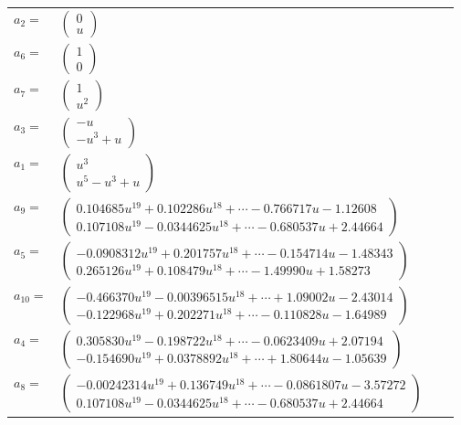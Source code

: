 \documentclass[1p]{elsarticle_modified}
\theoremstyle{definition}
\begin{document}
\begin{tabular}{m{7pt} m{180pt} m{7pt} m{180pt} }
\flushright $a_{2}=$&$\begin{pmatrix}0\\u\end{pmatrix}$ \\
\flushright $a_{6}=$&$\begin{pmatrix}1\\0\end{pmatrix}$ \\
\flushright $a_{7}=$&$\begin{pmatrix}1\\u^2\end{pmatrix}$ \\
\flushright $a_{3}=$&$\begin{pmatrix}- u\\- u^3+u\end{pmatrix}$ \\
\flushright $a_{1}=$&$\begin{pmatrix}u^3\\u^5- u^3+u\end{pmatrix}$ \\
\flushright $a_{9}=$&$\begin{pmatrix}0.104685 u^{19}+0.102286 u^{18}+\cdots-0.766717 u-1.12608\\0.107108 u^{19}-0.0344625 u^{18}+\cdots-0.680537 u+2.44664\end{pmatrix}$ \\
\flushright $a_{5}=$&$\begin{pmatrix}-0.0908312 u^{19}+0.201757 u^{18}+\cdots-0.154714 u-1.48343\\0.265126 u^{19}+0.108479 u^{18}+\cdots-1.49990 u+1.58273\end{pmatrix}$ \\
\flushright $a_{10}=$&$\begin{pmatrix}-0.466370 u^{19}-0.00396515 u^{18}+\cdots+1.09002 u-2.43014\\-0.122968 u^{19}+0.202271 u^{18}+\cdots-0.110828 u-1.64989\end{pmatrix}$ \\
\flushright $a_{4}=$&$\begin{pmatrix}0.305830 u^{19}-0.198722 u^{18}+\cdots-0.0623409 u+2.07194\\-0.154690 u^{19}+0.0378892 u^{18}+\cdots+1.80644 u-1.05639\end{pmatrix}$ \\
\flushright $a_{8}=$&$\begin{pmatrix}-0.00242314 u^{19}+0.136749 u^{18}+\cdots-0.0861807 u-3.57272\\0.107108 u^{19}-0.0344625 u^{18}+\cdots-0.680537 u+2.44664\end{pmatrix}$ \\

\end{tabular}
\end{document}
